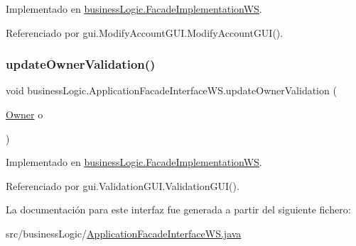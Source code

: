 Implementado en \mbox{\hyperlink{classbusiness_logic_1_1_facade_implementation_w_s_a6ee2c273a768beed556dd83d9e5ad035}{business\+Logic.\+Facade\+Implementation\+WS}}.



Referenciado por gui.\+Modify\+Account\+G\+U\+I.\+Modify\+Account\+G\+U\+I().

\mbox{\label{interfacebusiness_logic_1_1_application_facade_interface_w_s_a4932653f88b16660fa74ff6356a3f94b}} 
\subsubsection{\texorpdfstring{updateOwnerValidation()}{updateOwnerValidation()}}
{\footnotesize\ttfamily void business\+Logic.\+Application\+Facade\+Interface\+W\+S.\+update\+Owner\+Validation (\begin{DoxyParamCaption}\item[{\mbox{\hyperlink{classdomain_1_1_owner}{Owner}}}]{o }\end{DoxyParamCaption})}



Implementado en \mbox{\hyperlink{classbusiness_logic_1_1_facade_implementation_w_s_a9c3c6f8a2ec5a4d19defc324fc60c523}{business\+Logic.\+Facade\+Implementation\+WS}}.



Referenciado por gui.\+Validation\+G\+U\+I.\+Validation\+G\+U\+I().



La documentación para este interfaz fue generada a partir del siguiente fichero\+:\begin{DoxyCompactItemize}
\item 
src/business\+Logic/\mbox{\hyperlink{_application_facade_interface_w_s_8java}{Application\+Facade\+Interface\+W\+S.\+java}}\end{DoxyCompactItemize}
